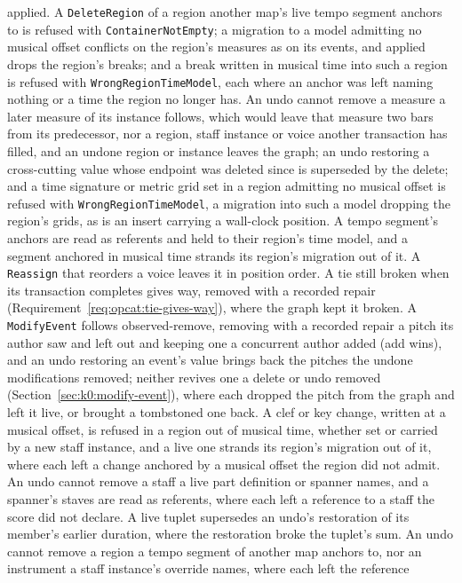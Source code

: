 \documentclass[11pt,letterpaper]{report}
\begin{document}
applied. A \texttt{DeleteRegion} of a region another map's live tempo segment
anchors to is refused with \texttt{ContainerNotEmpty}; a migration to a model
admitting no musical offset conflicts on the region's measures as on its
events, and applied drops the region's breaks; and a break written in musical
time into such a region is refused with \texttt{WrongRegionTimeModel}, each
where an anchor was left naming nothing or a time the region no longer has. An
undo cannot remove a measure a later measure of its instance follows, which
would leave that measure two bars from its predecessor, nor a region, staff
instance or voice another transaction has filled, and an undone region or
instance leaves the graph; an undo restoring a cross-cutting value whose
endpoint was deleted since is superseded by the delete; and a time signature
or metric grid set in a region admitting no musical offset is refused with
\texttt{WrongRegionTimeModel}, a migration into such a model dropping the
region's grids, as is an insert carrying a wall-clock position. A tempo
segment's anchors are read as referents and held to their region's time model,
and a segment anchored in musical time strands its region's migration out of
it. A \texttt{Reassign} that reorders a voice leaves it in position order. A
tie still broken when its transaction completes gives way, removed with a
recorded repair (Requirement~\ref{req:opcat:tie-gives-way}), where the graph
kept it broken.
A \texttt{ModifyEvent} follows observed-remove, removing with a recorded
repair a pitch its author saw and left out and keeping one a concurrent author
added (add wins), and an undo restoring an event's value brings back the
pitches the undone modifications removed; neither revives one a delete or undo
removed (Section~\ref{sec:k0:modify-event}), where each dropped the pitch from
the graph and left it live, or brought a tombstoned one back. A clef or key change, written at a musical offset, is
refused in a region out of musical time, whether set or carried by a new staff
instance, and a live one strands its region's migration out of it, where each
left a change anchored by a musical offset the region did not admit. An undo
cannot remove a staff a live part definition or spanner names, and a spanner's
staves are read as referents, where each left a reference to a staff the score
did not declare. A live tuplet supersedes an undo's restoration of its
member's earlier duration, where the restoration broke the tuplet's sum. An
undo cannot remove a region a tempo segment of another map anchors to, nor an
instrument a staff instance's override names, where each left the reference
\end{document}
